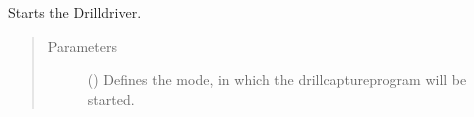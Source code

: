 \documentclass[letterpaper,10pt,english]{sphinxmanual}
\begin{document}
\begin{fulllineitems}
\begin{fulllineitems}
\sphinxAtStartPar
Starts the Drilldriver.
\begin{quote}\begin{description}
\item[{Parameters}] \leavevmode
\sphinxAtStartPar
{} (\sphinxstyleliteralemphasis{\sphinxupquote{, }}) \textendash{} Defines the mode, in which the drillcapture\sphinxhyphen{}program will be started.

\end{description}\end{quote}

\end{fulllineitems}


\end{fulllineitems}

\end{document}
